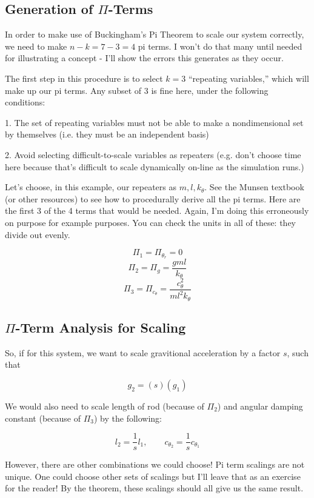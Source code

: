 \documentclass[12pt,letterpaper]{article}
\begin{document}
\subsection{Generation of $\Pi$-Terms}

In order to make use of Buckingham's Pi Theorem to scale our system correctly, we need to make $n-k = 7-3 = 4$ pi terms. I won't do that many until needed for illustrating a concept - I'll show the errors this generates as they occur.

The first step in this procedure is to select $k=3$ ``repeating variables,'' which will make up our pi terms. Any subset of 3 is fine here, under the following conditions:

1. The set of repeating variables must not be able to make a nondimensional set by themselves (i.e. they must be an independent basis)

2. Avoid selecting difficult-to-scale variables as repeaters (e.g. don't choose time here because that's difficult to scale dynamically on-line as the simulation runs.)


Let's choose, in this example, our repeaters as $m, l, k_{\theta}$. See the Munsen textbook (or other resources) to see how to procedurally derive all the pi terms. 
Here are the first 3 of the 4 terms that would be needed.
Again, I'm doing this erroneously on purpose for example purposes.
You can check the units in all of these: they divide out evenly.

\[
\Pi_1 = \Pi_{\theta_r} = 0
\]
\[
\Pi_2 = \Pi_{g} = \frac{gml}{k_{\theta}}
\]
\[
\Pi_3 = \Pi_{c_{\theta}} = \frac{c_{\theta}^2 }{m l^2 k_{\theta}}
\]

\subsection{$\Pi$-Term Analysis for Scaling}

So, if for this system, we want to scale gravitional acceleration by a factor $s$, such that

\[
g_2 = (s) (g_1)
\]

We would also need to scale length of rod (because of $\Pi_2$) and angular damping constant (because of $\Pi_3$) by the following:

\[
l_2 = \frac{1}{s} l_1, \quad \quad c_{\theta_2} = \frac{1}{s} c_{\theta_1}
\]

However, there are other combinations we could choose! 
Pi term scalings are not unique.
One could choose other sets of scalings but I'll leave that as an exercise for the reader!
By the theorem, these scalings should all give us the same result.
\end{document}
